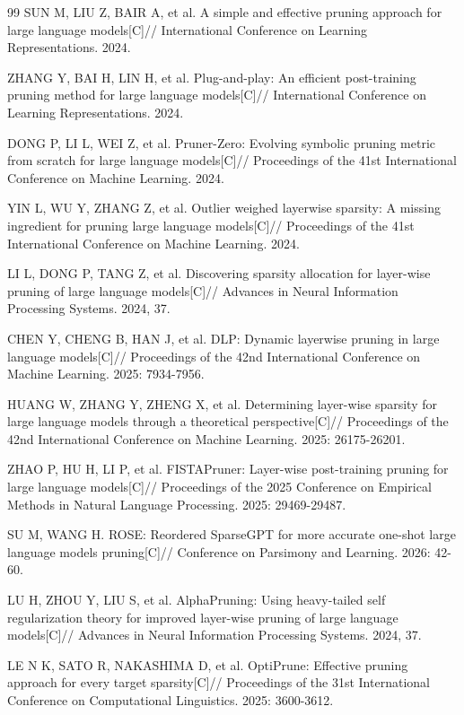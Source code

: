 \begin{thebibliography}{99}
SUN M, LIU Z, BAIR A, et al.
A simple and effective pruning approach for large language models[C]//
International Conference on Learning Representations.
2024.

ZHANG Y, BAI H, LIN H, et al.
Plug-and-play: An efficient post-training pruning method for large language models[C]//
International Conference on Learning Representations.
2024.

DONG P, LI L, WEI Z, et al.
Pruner-Zero: Evolving symbolic pruning metric from scratch for large language models[C]//
Proceedings of the 41st International Conference on Machine Learning.
2024.

YIN L, WU Y, ZHANG Z, et al.
Outlier weighed layerwise sparsity: A missing ingredient for pruning large language models[C]//
Proceedings of the 41st International Conference on Machine Learning.
2024.

LI L, DONG P, TANG Z, et al.
Discovering sparsity allocation for layer-wise pruning of large language models[C]//
Advances in Neural Information Processing Systems.
2024, 37.

CHEN Y, CHENG B, HAN J, et al.
DLP: Dynamic layerwise pruning in large language models[C]//
Proceedings of the 42nd International Conference on Machine Learning.
2025: 7934-7956.

HUANG W, ZHANG Y, ZHENG X, et al.
Determining layer-wise sparsity for large language models through a theoretical perspective[C]//
Proceedings of the 42nd International Conference on Machine Learning.
2025: 26175-26201.

ZHAO P, HU H, LI P, et al.
FISTAPruner: Layer-wise post-training pruning for large language models[C]//
Proceedings of the 2025 Conference on Empirical Methods in Natural Language Processing.
2025: 29469-29487.

SU M, WANG H.
ROSE: Reordered SparseGPT for more accurate one-shot large language models pruning[C]//
Conference on Parsimony and Learning.
2026: 42-60.

LU H, ZHOU Y, LIU S, et al.
AlphaPruning: Using heavy-tailed self regularization theory for improved layer-wise pruning of large language models[C]//
Advances in Neural Information Processing Systems.
2024, 37.

LE N K, SATO R, NAKASHIMA D, et al.
OptiPrune: Effective pruning approach for every target sparsity[C]//
Proceedings of the 31st International Conference on Computational Linguistics.
2025: 3600-3612.


\end{thebibliography}
